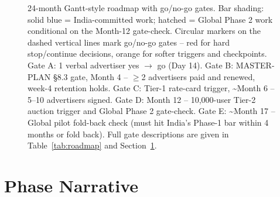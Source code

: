 \begin{figure}[htbp]
{%
}
\caption{24-month Gantt-style roadmap with go/no-go gates. Bar shading: solid blue = India-committed work; hatched = Global Phase 2 work conditional on the Month-12 gate-check. Circular markers on the dashed vertical lines mark go/no-go gates -- red for hard stop/continue decisions, orange for softer triggers and checkpoints. Gate A: 1 verbal advertiser yes $\rightarrow$ go (Day 14). Gate B: MASTER-PLAN \S8.3 gate, Month 4 -- $\geq$2 advertisers paid and renewed, week-4 retention holds. Gate C: Tier-1 rate-card trigger, \textasciitilde Month 6 -- 5--10 advertisers signed. Gate D: Month 12 -- 10,000-user Tier-2 auction trigger and Global Phase 2 gate-check. Gate E: \textasciitilde Month 17 -- Global pilot fold-back check (must hit India's Phase-1 bar within 4 months or fold back). Full gate descriptions are given in Table~\ref{tab:roadmap} and Section~\ref{sec:roadmap-narrative}.}
\label{fig:roadmap-gantt}
\end{figure}

\section{Phase Narrative}
\label{sec:roadmap-narrative}


